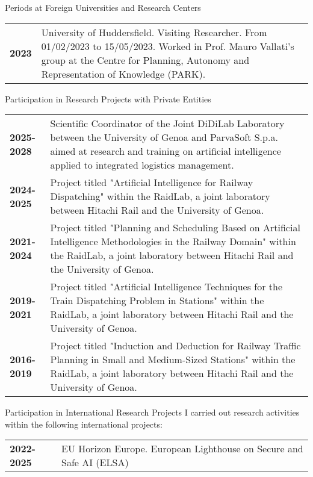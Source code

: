 \documentclass{resume} %
\begin{document}
\begin{rSection}{Periods at Foreign Universities and Research Centers}
	\begin{tabularx}{0.95\textwidth} {lp{14cm}}
 \textbf{2023} & University of Huddersfield. Visiting Researcher. From 01/02/2023 to 15/05/2023. Worked in Prof. Mauro Vallati’s group at the Centre for Planning, Autonomy and Representation of Knowledge (PARK).
 \end{tabularx}
\end{rSection}

\begin{rSection}{Participation in Research Projects with Private Entities}
	\begin{tabularx}{0.95\textwidth} {lp{14cm}}
 	\textbf{2025-2028} & Scientific Coordinator of the Joint DiDiLab Laboratory between the University of Genoa and ParvaSoft S.p.a. aimed at research and training on artificial intelligence applied to integrated logistics management. \\
 	\textbf{2024-2025} & Project titled "Artificial Intelligence for Railway Dispatching" within the RaidLab, a joint laboratory between Hitachi Rail and the University of Genoa. \\
  	\textbf{2021-2024} & Project titled "Planning and Scheduling Based on Artificial Intelligence Methodologies in the Railway Domain" within the RaidLab, a joint laboratory between Hitachi Rail and the University of Genoa. \\
   	\textbf{2019-2021} & Project titled "Artificial Intelligence Techniques for the Train Dispatching Problem in Stations" within the RaidLab, a joint laboratory between Hitachi Rail and the University of Genoa.\\
    \textbf{2016-2019} & Project titled "Induction and Deduction for Railway Traffic Planning in Small and Medium-Sized Stations" within the RaidLab, a joint laboratory between Hitachi Rail and the University of Genoa.\\
 \end{tabularx}
\end{rSection}

\begin{rSection}{Participation in International Research Projects}
I carried out research activities within the following international projects:\\
	\begin{tabularx}{0.95\textwidth} {lp{14cm}}
 \textbf{2022-2025} & EU Horizon Europe. European Lighthouse on Secure and Safe AI (ELSA)
 \end{tabularx}
\end{rSection}
\end{document}
